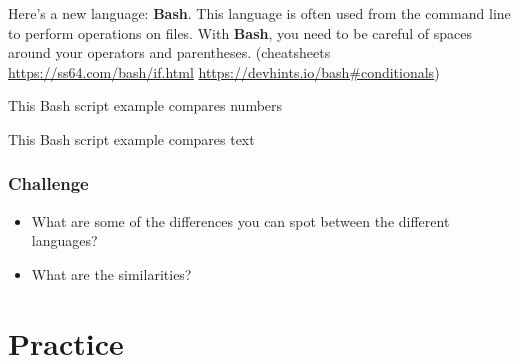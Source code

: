 \documentclass[
]{book}
\newenvironment{Shaded}{\begin{snugshade}}{\end{snugshade}}
\newcommand{\BuiltInTok}[1]{#1}
\newcommand{\ControlFlowTok}[1]{\textcolor[rgb]{0.13,0.29,0.53}{\textbf{#1}}}
\newcommand{\KeywordTok}[1]{\textcolor[rgb]{0.13,0.29,0.53}{\textbf{#1}}}
\newcommand{\OperatorTok}[1]{\textcolor[rgb]{0.81,0.36,0.00}{\textbf{#1}}}
\newcommand{\OtherTok}[1]{\textcolor[rgb]{0.56,0.35,0.01}{#1}}
\newcommand{\StringTok}[1]{\textcolor[rgb]{0.31,0.60,0.02}{#1}}
\newcommand{\VariableTok}[1]{\textcolor[rgb]{0.00,0.00,0.00}{#1}}
\providecommand{\tightlist}{%
  \setlength{\itemsep}{0pt}\setlength{\parskip}{0pt}}
\begin{document}
Here's a new language: \textbf{Bash}. This language is often used from the command line to perform operations on files. With \textbf{Bash}, you need to be careful of spaces around your operators and parentheses. (cheatsheets \url{https://ss64.com/bash/if.html} \url{https://devhints.io/bash\#conditionals})

This Bash script example compares numbers

\begin{Shaded}
\end{Shaded}

This Bash script example compares text

\begin{Shaded}
\end{Shaded}

\subsection{Challenge}\label{challenge}

\begin{itemize}
\tightlist
\item
  What are some of the differences you can spot between the different languages?
\item
  What are the similarities?
\end{itemize}

\chapter{Practice}\label{practice}
\end{document}
